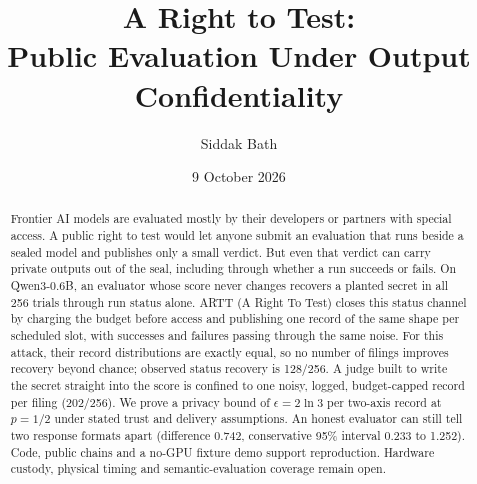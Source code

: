 \documentclass[10pt,twocolumn]{article}
\title{A Right to Test:\\Public Evaluation Under Output Confidentiality}
\author{Siddak Bath}
\date{9 October 2026}
\begin{document}
\raggedbottom
\maketitle

\begin{abstract}
Frontier AI models are evaluated mostly by their developers or partners with special access. A public right to test would let anyone submit an evaluation that runs beside a sealed model and publishes only a small verdict. But even that verdict can carry private outputs out of the seal, including through whether a run succeeds or fails. On Qwen3-0.6B, an evaluator whose score never changes recovers a planted secret in all 256 trials through run status alone. ARTT (A Right To Test) closes this status channel by charging the budget before access and publishing one record of the same shape per scheduled slot, with successes and failures passing through the same noise. For this attack, their record distributions are exactly equal, so no number of filings improves recovery beyond chance; observed status recovery is 128/256. A judge built to write the secret straight into the score is confined to one noisy, logged, budget-capped record per filing (202/256). We prove a privacy bound of $\epsilon=2\ln3$ per two-axis record at $p=1/2$ under stated trust and delivery assumptions. An honest evaluator can still tell two response formats apart (difference 0.742, conservative 95\% interval 0.233 to 1.252). Code, public chains and a no-GPU fixture demo support reproduction. Hardware custody, physical timing and semantic-evaluation coverage remain open.
\end{abstract}
\end{document}
